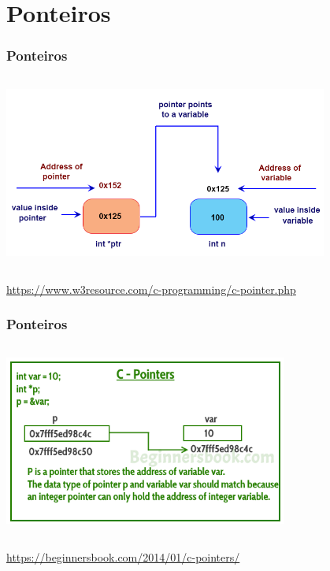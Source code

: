 \documentclass[xcolor={usenames,dvipsnames},12pt,presentation,aspectratio=169]{beamer}
\begin{document}
\section{Ponteiros}
\begin{frame}[fragile]
  \frametitle{Ponteiros}
  \begin{columns}
    \begin{column}{\textwidth}
      \begin{center}
    \includegraphics[width=0.8\textwidth]{c_pointer.png}
      \end{center}
    \end{column}
  \end{columns}
  {\footnotesize \url{https://www.w3resource.com/c-programming/c-pointer.php}}
\end{frame}
\begin{frame}[fragile]
  \frametitle{Ponteiros}
  \begin{columns}
    \begin{column}{\textwidth}
      \begin{center}
    \includegraphics[width=0.7\textwidth]{pointer_memory_representation}
      \end{center}
    \end{column}
  \end{columns}
  {\footnotesize \url{https://beginnersbook.com/2014/01/c-pointers/}}
\end{frame}
\end{document}
